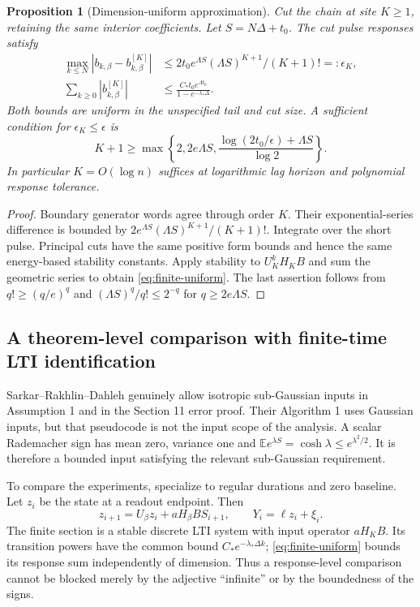 \documentclass[11pt,reqno]{amsart}
\newtheorem{proposition}[theorem]{Proposition}
\theoremstyle{remark}\newtheorem{remark}[theorem]{Remark}
\newcommand{\E}{\mathbb E}\newcommand{\Pp}{\mathbb P}
\begin{document}
\begin{proposition}[Dimension-uniform approximation]
\label{prop:finite-section}
Cut the chain at site $K\ge1$, retaining the same interior coefficients.
Let $S=N\Delta+t_0$. The cut pulse responses satisfy
\begin{align}
 \max_{k\le N}|b_{k,\beta}-b^{[K]}_{k,\beta}|
 &\le 2t_0e^{\Lambda S}(\Lambda S)^{K+1}/(K+1)!=:\epsilon_K,
 \label{eq:finite-bias}\\
 \sum_{k\ge0}|b^{[K]}_{k,\beta}|
 &\le\frac{C_*t_0e^{\Lambda t_0}}{1-e^{-\lambda_*\Delta}}.
 \label{eq:finite-uniform}
\end{align}
Both bounds are uniform in the unspecified tail and cut size. A sufficient
condition for $\epsilon_K\le\epsilon$ is
\[
 K+1\ge\max\left\{2,2e\Lambda S,
 \frac{\log(2t_0/\epsilon)+\Lambda S}{\log2}\right\}.
\]
In particular $K=O(\log n)$ suffices at logarithmic lag horizon and polynomial
response tolerance.
\end{proposition}
\begin{proof}
Boundary generator words agree through order $K$. Their exponential-series
difference is bounded by $2e^{\Lambda S}(\Lambda S)^{K+1}/(K+1)!$.
Integrate over the short pulse. Principal cuts have the same positive form
bounds and hence the same energy-based stability constants. Apply stability
to $U_K^kH_KB$ and sum the geometric series to obtain
\eqref{eq:finite-uniform}. The last assertion follows from
$q!\ge(q/e)^q$ and $(\Lambda S)^q/q!\le2^{-q}$ for $q\ge2e\Lambda S$.
\end{proof}

\subsection{A theorem-level comparison with finite-time LTI identification}
\label{sec:comparison}
Sarkar--Rakhlin--Dahleh \cite{SRD2020} genuinely allow isotropic sub-Gaussian
inputs in Assumption 1 and in the Section 11 error proof. Their Algorithm 1
uses Gaussian inputs, but that pseudocode is not the input scope of the
analysis. A scalar Rademacher sign has mean zero, variance one and
$\E e^{\lambda S}=\cosh\lambda\le e^{\lambda^2/2}$. It is therefore a
bounded input satisfying the relevant sub-Gaussian requirement.

To compare the experiments, specialize to regular durations and zero baseline.
Let $z_i$ be the state at a readout endpoint. Then
\[
 z_{i+1}=U_\beta z_i+aH_\beta B S_{i+1},\qquad
 Y_i=\ell z_i+\xi_i.
\]
The finite section is a stable discrete LTI system with input operator $aH_KB$.
Its transition powers have the common bound $C_*e^{-\lambda_*\Delta k}$;
\eqref{eq:finite-uniform} bounds its response sum independently of dimension.
Thus a response-level comparison cannot be blocked merely by the adjective
``infinite'' or by the boundedness of the signs.
\end{document}
